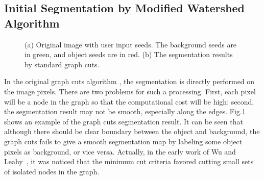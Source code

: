 \subsection{Initial Segmentation by Modified Watershed Algorithm} \label{sec:3:algo}
    \begin{figure}[htp]
    \centering
    {
    }
    \caption{(a) Original image with user input seeds. The background seeds
    are in green, and object seeds are in red. (b) The segmentation results by standard graph
    cuts.  }
    \label{fig:standard}
    \end{figure}

    In the original graph cuts algorithm \cite{Yuri01}, the segmentation is directly performed on the image pixels. There are two problems for such a processing. First, each pixel will be a node in the graph so that the computational cost will be high; second, the segmentation result may not be smooth, especially along the edges. Fig.\ref{fig:standard} shows an example of the graph cuts segmentation result. It can be seen that although there should be clear boundary between the object
    and background, the graph cuts fails to give a smooth segmentation map by labeling some object pixels as background, or vice versa. Actually, in the early work of Wu and Leahy~\cite{Wu_minicut}, it was noticed that the minimum cut criteria favored cutting small sets of isolated nodes in the graph.

